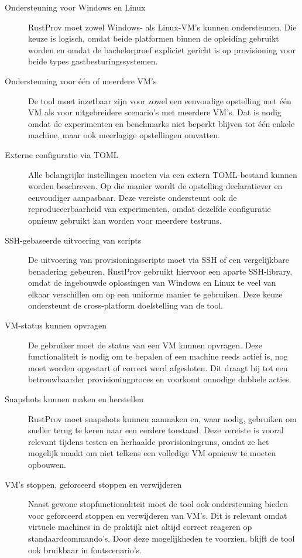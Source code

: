 \begin{description}
    \item[Ondersteuning voor Windows en Linux] RustProv moet zowel Windows- als Linux-VM’s kunnen ondersteunen. Die keuze is logisch, omdat beide platformen binnen de opleiding gebruikt worden en omdat de bachelorproef expliciet gericht is op provisioning voor beide types gastbesturingssystemen.
    
    \item[Ondersteuning voor één of meerdere VM’s] De tool moet inzetbaar zijn voor zowel een eenvoudige opstelling met één VM als voor uitgebreidere scenario’s met meerdere VM’s. Dat is nodig omdat de experimenten en benchmarks niet beperkt blijven tot één enkele machine, maar ook meerlagige opstellingen omvatten.
    
    \item[Externe configuratie via TOML] Alle belangrijke instellingen moeten via een extern TOML-bestand kunnen worden beschreven. Op die manier wordt de opstelling declaratiever en eenvoudiger aanpasbaar. Deze vereiste ondersteunt ook de reproduceerbaarheid van experimenten, omdat dezelfde configuratie opnieuw gebruikt kan worden voor meerdere testruns.
    
    \item[SSH-gebaseerde uitvoering van scripts] De uitvoering van provisioningsscripts moet via SSH of een vergelijkbare benadering gebeuren. RustProv gebruikt hiervoor een aparte SSH-library, omdat de ingebouwde oplossingen van Windows en Linux te veel van elkaar verschillen om op een uniforme manier te gebruiken. Deze keuze ondersteunt de cross-platform doelstelling van de tool.
    
    \item[VM-status kunnen opvragen] De gebruiker moet de status van een VM kunnen opvragen. Deze functionaliteit is nodig om te bepalen of een machine reeds actief is, nog moet worden opgestart of correct werd afgesloten. Dit draagt bij tot een betrouwbaarder provisioningproces en voorkomt onnodige dubbele acties.
    
    \item[Snapshots kunnen maken en herstellen] RustProv moet snapshots kunnen aanmaken en, waar nodig, gebruiken om sneller terug te keren naar een eerdere toestand. Deze vereiste is vooral relevant tijdens testen en herhaalde provisioningruns, omdat ze het mogelijk maakt om niet telkens een volledige VM opnieuw te moeten opbouwen.
    
    \item[VM’s stoppen, geforceerd stoppen en verwijderen] Naast gewone stopfunctionaliteit moet de tool ook ondersteuning bieden voor geforceerd stoppen en verwijderen van VM’s. Dit is relevant omdat virtuele machines in de praktijk niet altijd correct reageren op standaardcommando’s. Door deze mogelijkheden te voorzien, blijft de tool ook bruikbaar in foutscenario’s.
    

\end{description}
